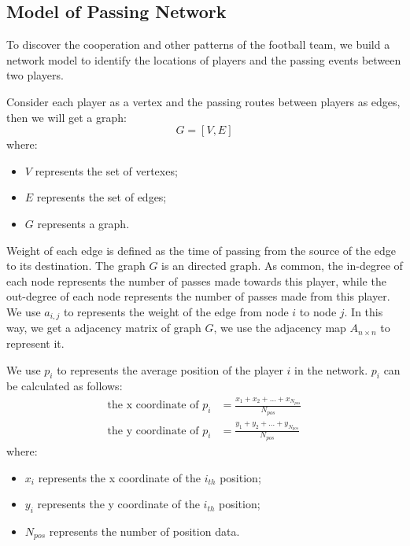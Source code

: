 \documentclass[12pt]{mcmthesis}
\begin{document}
\subsection{Model of Passing Network}
To discover the cooperation and other patterns of the football team, we build a network model to identify the locations of players and the passing events between two players.

Consider each player as a vertex and the passing routes between players as edges, then we will get a graph:
\begin{equation}\label{eq:graph}
G = \left[V, E\right]
\end{equation}
where:
\begin{itemize}
	\item $V$ represents the set of vertexes;
	\item $E$ represents the set of edges;
	\item $G$ represents a graph.
\end{itemize}

Weight of each edge is defined as the time of passing from the source of the edge to its destination. The graph $G$ is an directed graph. As common, the in-degree of each node represents the number of passes made towards this player, while the out-degree of each node represents the number of passes made from this player. We use $a_{i, j}$ to represents the weight of the edge from node $i$ to node $j$. In this way, we get a adjacency matrix of graph $G$, we use the adjacency map $A_{n \times n}$ to represent it.

We use $p_{i}$ to represents the average position of the player $i$ in the network. $p_{i}$ can be calculated as follows:
\begin{align}\label{eq:pos}
\text{the x coordinate of } p_{i}&=\frac{x_1 + x_2 +\dots +x_{N_{pos}}}{N_{pos}}\nonumber\\
\text{the y coordinate of } p_{i}&=\frac{y_1 + y_2 +\dots +y_{N_{pos}}}{N_{pos}}
\end{align}
where:
\begin{itemize}
	\item $x_{i}$ represents the x coordinate of the $i_{th}$ position;
	\item $y_{i}$ represents the y coordinate of the $i_{th}$ position;
	\item $N_{pos}$ represents the number of position data.
\end{itemize}
\end{document}
